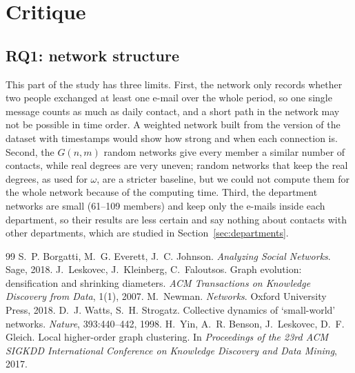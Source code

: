 \documentclass[12pt, a4paper]{article}
\begin{document}

\section{Critique}
\label{critique}

\subsection{RQ1: network structure}
This part of the study has three limits. First, the network only records
whether two people exchanged at least one e-mail over the whole period, so one
single message counts as much as daily contact, and a short path in the network
may not be possible in time order. A weighted network built from the version
of the dataset with timestamps would show how strong and when each connection
is. Second, the $G(n,m)$ random networks give every member a similar number of
contacts, while real degrees are very uneven; random networks that keep the
real degrees, as used for $\omega$, are a stricter baseline, but we could not
compute them for the whole network because of the computing time. Third, the
department networks are small (61--109 members) and keep only the e-mails
inside each department, so their results are less certain and say nothing
about contacts with other departments, which are studied in
Section~\ref{sec:departments}.


\begin{thebibliography}{99}
 S.~P. Borgatti, M.~G. Everett, J.~C. Johnson.
  \emph{Analyzing Social Networks}. Sage, 2018.
 J.~Leskovec, J.~Kleinberg, C.~Faloutsos. Graph evolution:
  densification and shrinking diameters. \emph{ACM Transactions on Knowledge
  Discovery from Data}, 1(1), 2007.
 M.~Newman. \emph{Networks}. Oxford University Press, 2018.
 D.~J. Watts, S.~H. Strogatz. Collective dynamics of
  `small-world' networks. \emph{Nature}, 393:440--442, 1998.
 H.~Yin, A.~R. Benson, J.~Leskovec, D.~F. Gleich. Local
  higher-order graph clustering. In \emph{Proceedings of the 23rd ACM SIGKDD
  International Conference on Knowledge Discovery and Data Mining}, 2017.
\end{thebibliography}
\end{document}
